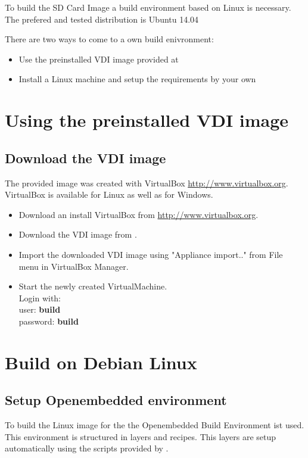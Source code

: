 To build the \ov SD Card Image a build environment based on Linux is necessary.
The prefered and tested distribution is Ubuntu 14.04

There are two ways to come to a own build enivronment:

\begin{itemize}
	\item Use the preinstalled VDI image provided at \ovwebsite{}
	\item Install a Linux machine and setup the requirements by your own
\end{itemize}

\section{Using the preinstalled VDI image}

\subsection{Download the VDI image}
The provided image was created with VirtualBox\textsuperscript{\textcopyright} \url{http://www.virtualbox.org}. VirtualBox is available for Linux as well as for Windows\textsuperscript{\textcopyright}.

\begin{itemize}
	\item Download an install VirtualBox\textsuperscript{\textcopyright} from \url{http://www.virtualbox.org}.
	\item Download the VDI image from \ovwebsite{} .
	\item Import the downloaded VDI image using "Appliance import.." from File menu in VirtualBox Manager.
	\item Start the newly created VirtualMachine. \\
		Login with: \\
			user: \textbf{build} \\
			password: \textbf{build} \\
\end{itemize}



\section{Build on Debian Linux} 

\subsection{Setup Openembedded environment}
To build the Linux image for the \ovfc the Openembedded Build Environment ist used. This environment is structured in layers and recipes. This layers are setup automatically using the scripts provided by \ovwebsite{}.

